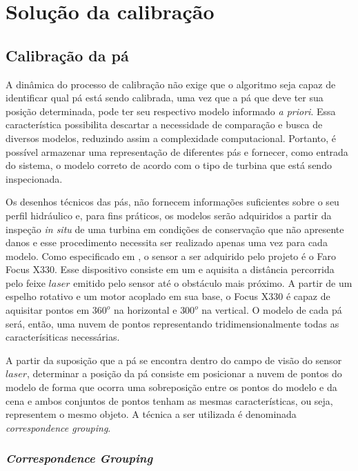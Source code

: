 \section{Solução da calibração}

\subsection{Calibração da pá}

A dinâmica do processo de calibração não exige que o algoritmo seja capaz de
identificar qual pá está sendo calibrada, uma vez que a pá que deve ter sua
posição determinada, pode ter seu respectivo modelo informado \textit{a priori}.
Essa característica possibilita descartar a necessidade de comparação e busca de
diversos modelos, reduzindo assim a complexidade computacional. Portanto, é
possível armazenar uma representação de diferentes pás e fornecer, 
como entrada do sistema, o modelo correto de acordo com o tipo de turbina que
está sendo inspecionada.

Os desenhos técnicos das pás, não fornecem informações suficientes
sobre o seu perfil hidráulico e, para fins práticos, os modelos serão adquiridos
a partir da inspeção \textit{in situ} de uma turbina em condições de conservação
que não apresente danos e esse procedimento necessita ser realizado apenas uma
vez para cada modelo. Como especificado em \cite{EMMA DETAIL}, %
o sensor a ser adquirido pelo projeto é o Faro Focus X330. Esse dispositivo
consiste em um  e aquisita a distância percorrida pelo
feixe $laser$ emitido pelo sensor até o obstáculo mais próximo. A partir de um
espelho rotativo e um motor acoplado em sua base, o Focus X330 é capaz de
aquisitar pontos em $360^o$ na horizontal e $300^o$ na vertical. O modelo de
cada pá será, então, uma nuvem de pontos representando tridimensionalmente todas
as caracterísiticas necessárias.

A partir da suposição que a pá se encontra dentro do campo de visão do sensor
$laser$, determinar a posição da pá consiste em posicionar a nuvem de pontos do
modelo de forma que ocorra uma sobreposição entre os pontos do modelo e da cena
e ambos conjuntos de pontos tenham as mesmas características, ou seja,
representem o mesmo objeto. A técnica a ser utilizada é denominada
\textit{correspondence grouping}. 


\subsubsection{\textit{Correspondence Grouping}}
 
